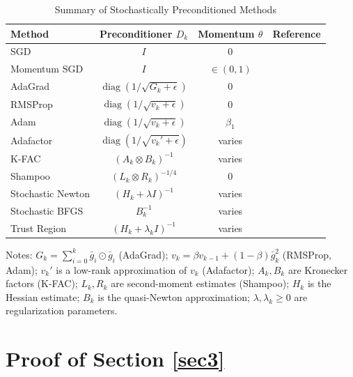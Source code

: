 \documentclass{article}
\newcommand{\barg}{\bar{g}}
\theoremstyle{plain}
\theoremstyle{definition}
\theoremstyle{remark}
\begin{document}
\begin{table}[h]
\centering
\caption{Summary of Stochastically Preconditioned Methods}
\label{tab:preconditioned_methods}
\begin{threeparttable}
\begin{tabular}{lccc}
\toprule
\textbf{Method} & \textbf{Preconditioner $D_k$} & \textbf{Momentum $\theta$} & \textbf{Reference} \\
\midrule
SGD & $I$ & $0$ & \citet{Robbins1951Stochastic} \\
Momentum SGD & $I$ & $\in (0,1)$ & \citet{Polyak1964Some} \\
\midrule
AdaGrad & $\operatorname{diag}(1/\sqrt{G_k+\epsilon})$ & $0$ & \citet{Duchi2011Adaptive} \\
RMSProp & $\operatorname{diag}(1/\sqrt{v_k+\epsilon})$ & $0$ & \citet{Tieleman2012Lecture} \\
Adam & $\operatorname{diag}(1/\sqrt{v_k+\epsilon})$ & $\beta_1$ & \citet{Kingma2014Adam} \\
Adafactor & $\operatorname{diag}(1/\sqrt{v_k'+\epsilon})$ & varies & \citet{zhai2022scaling} \\
\midrule
K-FAC & $(A_k \otimes B_k)^{-1}$ & varies & \citet{martens2015optimizing} \\
Shampoo & $(L_k \otimes R_k)^{-1/4}$ & $0$ & \citet{Gupta2018Shampoo} \\
\midrule
Stochastic Newton & $(H_k + \lambda I)^{-1}$ & varies & \citet{bottou2018optimization} \\
Stochastic BFGS & $B_k^{-1}$ & varies & \citet{Wang2017Stochastic} \\
Trust Region & $(H_k + \lambda_k I)^{-1}$ & varies & \citet{Curtis2022Fully} \\
\bottomrule
\end{tabular}
\begin{tablenotes}
\small
\item Notes: $G_k = \sum_{i=0}^k \barg_i \odot \barg_i$ (AdaGrad); $v_k = \beta v_{k-1} + (1-\beta)\barg_k^2$ (RMSProp, Adam); $v_k'$ is a low-rank approximation of $v_k$ (Adafactor); $A_k, B_k$ are Kronecker factors (K-FAC); $L_k, R_k$ are second-moment estimates (Shampoo); $H_k$ is the Hessian estimate; $B_k$ is the quasi-Newton approximation; $\lambda, \lambda_k \geq 0$ are regularization parameters.
\end{tablenotes}
\end{threeparttable}
\end{table}
%
\section{Proof of Section \ref{sec3}}\label{append_C}
\end{document}
